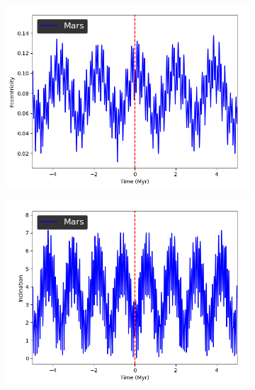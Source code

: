 \documentclass[11pt, oneside]{article}   	%
\begin{document}
\begin{figure}[!h]
	\ContinuedFloat
    \centering
    \begin{subfigure}[t]{0.49\textwidth}
    \captionsetup{width=0.9\textwidth}
	\centering
       	 \includegraphics[width=\textwidth]{Eccentricity_Mars}
    \end{subfigure}
    \begin{subfigure}[t]{0.49\textwidth}
    \captionsetup{width=0.9\textwidth}
        	\centering
	\includegraphics[width=\textwidth]{Inclination_Mars}
    \end{subfigure}
\end{figure}
\end{document}
